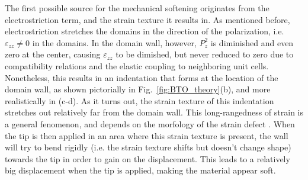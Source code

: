 
The first possible source for the mechanical softening originates from the electrostriction term, and the strain texture it results in.
As mentioned before, electrostriction stretches the domains in the direction of the polarization, i.e. $\varepsilon_{zz} \neq 0$ in the domains.
In the domain wall, however, $P_z^2$ is diminished and even zero at the center, causing $\varepsilon_{zz}$ to be dimished, but never reduced to zero due to compatibility relations and the elastic coupling to neighboring unit cells.
Nonetheless, this results in an indentation that forms at the location of the domain wall, as shown pictorially in Fig.~\ref{fig:BTO_theory}(b), and more realistically in (c-d).
As it turns out, the strain texture of this indentation stretches out relatively far  from the domain wall.
This long-rangedness of strain is a general fenomenon, and depends on the morfology of the strain defect . When the tip is then applied in an area where this strain texture is present, the wall will try to bend rigidly (i.e. the strain texture shifts but doesn't change shape) towards the tip in order to gain on the displacement.
This leads to a relatively big displacement when the tip is applied, making the material appear soft.

